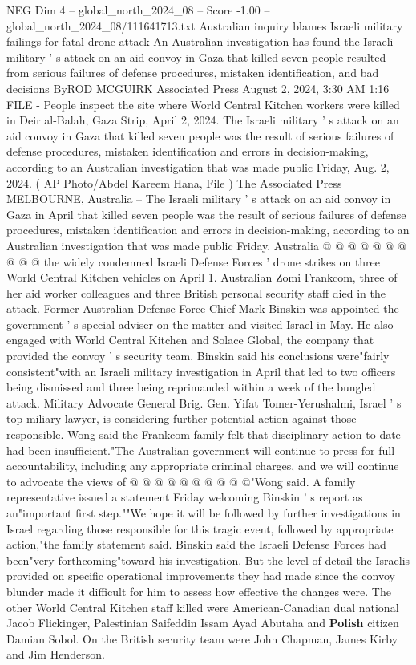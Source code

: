 \begin{textsample}{NEG Dim 4 – global\_north\_2024\_08 – Score -1.00 – global\_north\_2024\_08/111641713.txt}  \label{ex:f4_neg_301}
Australian inquiry blames Israeli military failings for fatal drone attack An Australian investigation has found the Israeli military ' s attack on an aid convoy in Gaza that killed seven people resulted from serious failures of defense procedures, mistaken identification, and bad decisions ByROD MCGUIRK Associated Press August 2, 2024, 3:30 AM 1:16 FILE - People inspect the site where World Central Kitchen workers were killed in Deir al-Balah, Gaza Strip, April 2, 2024.
The Israeli military ' s attack on an aid convoy in Gaza that killed seven people was the result of serious failures of defense procedures, mistaken identification and errors in decision-making, according to an Australian investigation that was made public Friday, Aug. 2, 2024. ( AP Photo/Abdel Kareem Hana, File ) The Associated Press MELBOURNE, Australia -- The Israeli military ' s attack on an aid convoy in Gaza in April that killed seven people was the result of serious failures of defense procedures, mistaken identification and errors in decision-making, according to an Australian investigation that was made public Friday.
Australia @ @ @ @ @ @ @ @ @ @ the widely condemned Israeli Defense Forces ' drone strikes on three World Central Kitchen vehicles on April 1.
Australian Zomi Frankcom, three of her aid worker colleagues and three British personal security staff died in the attack.
Former Australian Defense Force Chief Mark Binskin was appointed the government ' s special adviser on the matter and visited Israel in May.
He also engaged with World Central Kitchen and Solace Global, the company that provided the convoy ' s security team.
Binskin said his conclusions were"fairly consistent"with an Israeli military investigation in April that led to two officers being dismissed and three being reprimanded within a week of the bungled attack.
Military Advocate General Brig.
Gen.
Yifat Tomer-Yerushalmi, Israel ' s top miliary lawyer, is considering further potential action against those responsible.
Wong said the Frankcom family felt that disciplinary action to date had been insufficient."The Australian government will continue to press for full accountability, including any appropriate criminal charges, and we will continue to advocate the views of @ @ @ @ @ @ @ @ @ @"Wong said.
A family representative issued a statement Friday welcoming Binskin ' s report as an"important first step.""We hope it will be followed by further investigations in Israel regarding those responsible for this tragic event, followed by appropriate action,"the family statement said.
Binskin said the Israeli Defense Forces had been"very forthcoming"toward his investigation.
But the level of detail the Israelis provided on specific operational improvements they had made since the convoy blunder made it difficult for him to assess how effective the changes were.
The other World Central Kitchen staff killed were American-Canadian dual national Jacob Flickinger, Palestinian Saifeddin Issam Ayad Abutaha and \textbf{Polish} citizen Damian Sobol.
On the British security team were John Chapman, James Kirby and Jim Henderson.

\end{textsample}
